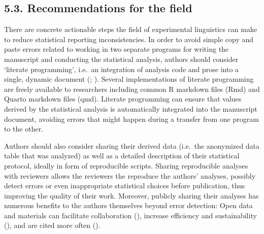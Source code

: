 \documentclass[
  doc,
  longtable,
  nolmodern,
  notxfonts,
  notimes,
  colorlinks=true,linkcolor=blue,citecolor=blue,urlcolor=blue]{apa7}
\begin{document}
\subsection{5.3. Recommendations for the
field}\label{recommendations-for-the-field}

There are concrete actionable steps the field of experimental
linguistics can make to reduce statistical reporting inconsistencies. In
order to avoid simple copy and paste errors related to working in two
separate programs for writing the manuscript and conducting the
statistical analysis, authors should consider `literate programming',
i.e.~an integration of analysis code and prose into a single, dynamic
document (;
). Several implementations
of literate programming are freely available to researchers including
common R markdown files (Rmd) and Quarto markdown files (qmd). Literate
programming can ensure that values derived by the statistical analysis
is automatically integrated into the manuscript document, avoiding
errors that might happen during a transfer from one program to the
other.

Authors should also consider sharing their derived data (i.e.~the
anonymized data table that was analyzed) as well as a detailed
description of their statistical protocol, ideally in form of
reproducible scripts. Sharing reproducible analyses with reviewers
allows the reviewers the reproduce the authors' analyses, possibly
detect errors or even inappropriate statistical choices before
publication, thus improving the quality of their work. Moreover,
publicly sharing their analyses has numerous benefits to the authors
themselves beyond error detection: Open data and materials can
facilitate collaboration (), increase efficiency and sustainability
(), and are cited
more often ().
\end{document}
